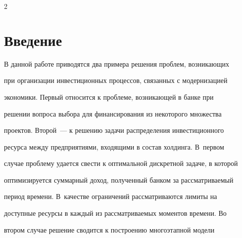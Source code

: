 \vspace*{-2pt}


      












      \thispagestyle{headings}





      \begin{multicols}{2}


      


            \label{st\stat}








\section{Введение}





В данной работе приводятся два примера решения проблем, возникающих 


при организации инвестиционных процессов, связанных с модернизацией 


экономики. Первый относится к проблеме, возникающей в банке при 


решении вопроса выбора для финансирования из некоторого множества 


проектов. Второй~--- к решению задачи распределения инвестиционного 


ресурса между предприятиями, входящими в состав холдинга. В~первом 


случае проблему удается свести к оптимальной дискретной задаче, в которой 


оптимизируется суммарный доход, полученный банком за рассматриваемый 


период времени. В~качестве ограничений рассматриваются лимиты на 


доступные ресурсы в каждый из рассматриваемых моментов времени. Во 


втором случае решение сводится к построению многоэтапной модели 



\end{multicols}
